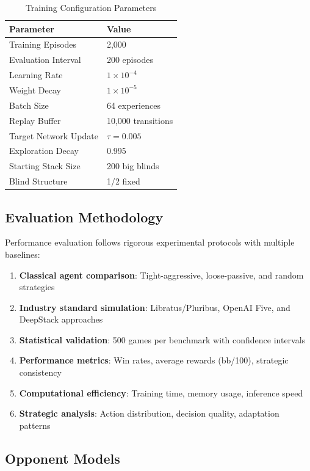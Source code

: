 \documentclass[11pt,a4paper]{article}
\begin{document}
\begin{table}[h]
\centering
\begin{tabular}{@{}ll@{}}
\toprule
\textbf{Parameter} & \textbf{Value} \\
\midrule
Training Episodes & 2,000 \\
Evaluation Interval & 200 episodes \\
Learning Rate & $1 \times 10^{-4}$ \\
Weight Decay & $1 \times 10^{-5}$ \\
Batch Size & 64 experiences \\
Replay Buffer & 10,000 transitions \\
Target Network Update & $\tau = 0.005$ \\
Exploration Decay & 0.995 \\
Starting Stack Size & 200 big blinds \\
Blind Structure & 1/2 fixed \\
\bottomrule
\end{tabular}
\caption{Training Configuration Parameters}
\label{tab:training_config}
\end{table}

\subsection{Evaluation Methodology}

Performance evaluation follows rigorous experimental protocols with multiple baselines:

\begin{enumerate}
\item \textbf{Classical agent comparison}: Tight-aggressive, loose-passive, and random strategies
\item \textbf{Industry standard simulation}: Libratus/Pluribus, OpenAI Five, and DeepStack approaches
\item \textbf{Statistical validation}: 500 games per benchmark with confidence intervals
\item \textbf{Performance metrics}: Win rates, average rewards (bb/100), strategic consistency
\item \textbf{Computational efficiency}: Training time, memory usage, inference speed
\item \textbf{Strategic analysis}: Action distribution, decision quality, adaptation patterns
\end{enumerate}

\subsection{Opponent Models}
\end{document}
